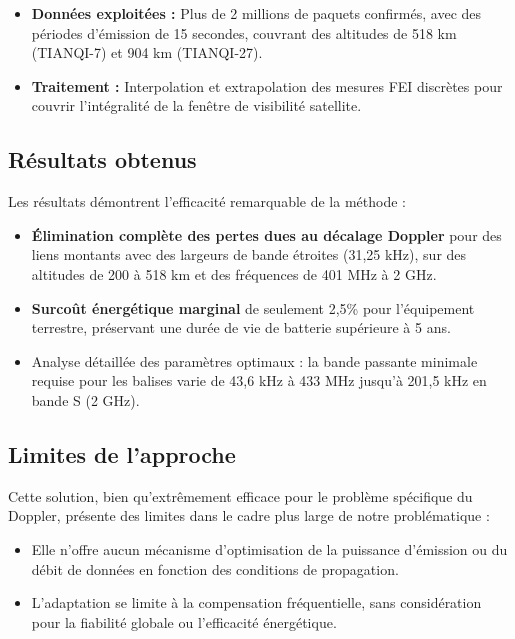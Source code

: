 \begin{itemize}
	\item \textbf{Données exploitées :} Plus de 2 millions de paquets confirmés, avec des périodes d'émission de 15 secondes, couvrant des altitudes de 518 km (TIANQI-7) et 904 km (TIANQI-27).
	\item \textbf{Traitement :} Interpolation et extrapolation des mesures FEI discrètes pour couvrir l'intégralité de la fenêtre de visibilité satellite.
\end{itemize}

\subsection{Résultats obtenus}

Les résultats démontrent l'efficacité remarquable de la méthode :

\begin{itemize}
	\item \textbf{Élimination complète des pertes dues au décalage Doppler} pour des liens montants avec des largeurs de bande étroites (31,25 kHz), sur des altitudes de 200 à 518 km et des fréquences de 401 MHz à 2 GHz.
	\item \textbf{Surcoût énergétique marginal} de seulement 2,5\% pour l'équipement terrestre, préservant une durée de vie de batterie supérieure à 5 ans.
	\item Analyse détaillée des paramètres optimaux : la bande passante minimale requise pour les balises varie de 43,6 kHz à 433 MHz jusqu'à 201,5 kHz en bande S (2 GHz).
\end{itemize}

\subsection{Limites de l'approche}

Cette solution, bien qu'extrêmement efficace pour le problème spécifique du Doppler, présente des limites dans le cadre plus large de notre problématique :

\begin{itemize}
	\item Elle n'offre aucun mécanisme d'optimisation de la puissance d'émission ou du débit de données en fonction des conditions de propagation.
	\item L'adaptation se limite à la compensation fréquentielle, sans considération pour la fiabilité globale ou l'efficacité énergétique.
\end{itemize}

